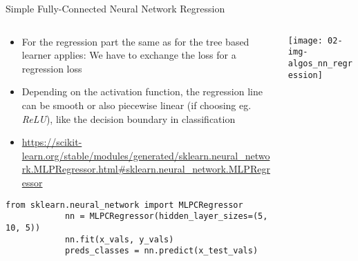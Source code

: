   \begin{frame}[fragile]{Simple Fully-Connected Neural Network Regression}
    \begin{columns}
      \begin{column}{0.65\textwidth}
        \begin{itemize}
          \item For the regression part the same as for the tree based learner applies: We have to exchange the loss for a regression loss
          \item Depending on the activation function, the regression line can be smooth or also piecewise linear (if choosing eg. \emph{ReLU}), like the decision boundary in classification
          \item \small\url{https://scikit-learn.org/stable/modules/generated/sklearn.neural_network.MLPRegressor.html#sklearn.neural_network.MLPRegressor}
        \end{itemize}
        \begin{mdframed}
          \begin{lstlisting}[style=dark, gobble=10, title=\lsttitlelight{Neural Network regression [Note: example shortened]}]
            from sklearn.neural_network import MLPCRegressor
            nn = MLPCRegressor(hidden_layer_sizes=(5, 10, 5))
            nn.fit(x_vals, y_vals)
            preds_classes = nn.predict(x_test_vals)
          \end{lstlisting}
        \end{mdframed}
      \end{column}
      \begin{column}{0.35\textwidth}
        \vspace{1em}

        \texttt{[image: 02-img-algos\_nn\_regression]}
      \end{column}
    \end{columns}
  \end{frame}


